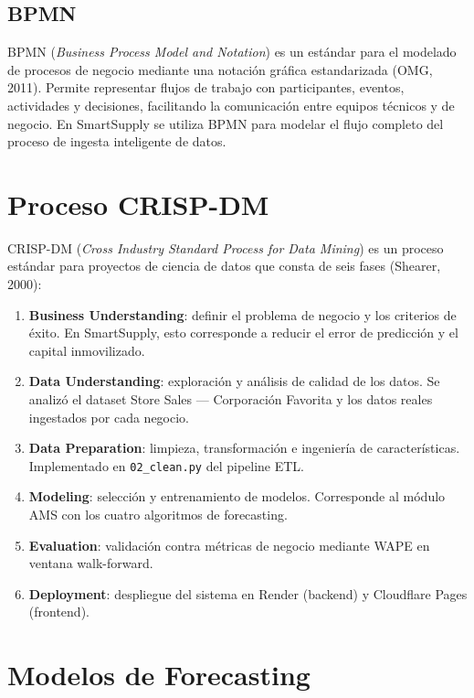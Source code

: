 \documentclass[12pt, a4paper]{report}
\begin{document}
\subsection{BPMN}

BPMN (\textit{Business Process Model and Notation}) es un estándar para el modelado
de procesos de negocio mediante una notación gráfica estandarizada (OMG, 2011).
Permite representar flujos de trabajo con participantes, eventos, actividades y
decisiones, facilitando la comunicación entre equipos técnicos y de negocio.
En SmartSupply se utiliza BPMN para modelar el flujo completo del proceso de
ingesta inteligente de datos.

\section{Proceso CRISP-DM}

CRISP-DM (\textit{Cross Industry Standard Process for Data Mining}) es un proceso estándar
para proyectos de ciencia de datos que consta de seis fases (Shearer, 2000):

\begin{enumerate}
  \item \textbf{Business Understanding}: definir el problema de negocio y los criterios
        de éxito. En SmartSupply, esto corresponde a reducir el error de predicción y el
        capital inmovilizado.
  \item \textbf{Data Understanding}: exploración y análisis de calidad de los datos.
        Se analizó el dataset Store Sales — Corporación Favorita y los datos reales
        ingestados por cada negocio.
  \item \textbf{Data Preparation}: limpieza, transformación e ingeniería de
        características. Implementado en \texttt{02\_clean.py} del pipeline ETL.
  \item \textbf{Modeling}: selección y entrenamiento de modelos. Corresponde al módulo
        AMS con los cuatro algoritmos de forecasting.
  \item \textbf{Evaluation}: validación contra métricas de negocio mediante WAPE en
        ventana walk-forward.
  \item \textbf{Deployment}: despliegue del sistema en Render (backend) y Cloudflare
        Pages (frontend).
\end{enumerate}

\section{Modelos de Forecasting}
\end{document}

